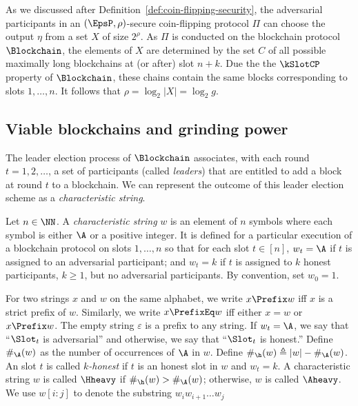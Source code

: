 As we discussed after Definition~\ref{def:coin-flipping-security}, 
the adversarial participants in an $(\EpsP, \rho)$-secure 
coin-flipping protocol $\Pi$ can choose the output $\eta$ 
from a set $X$ of size $2^\rho$. 
As $\Pi$ is conducted on the blockchain protocol $\Blockchain$, 
the elements of $X$ are determined by 
the set $C$ of all possible maximally long blockchains 
at (or after) slot $n + k$. 
Due the the $\kSlotCP$ property of $\Blockchain$, 
these chains contain the same blocks corresponding to slots $1, \ldots, n$. 
It follows that $\rho = \log_2 |X| = \log_2 g$.

\subsection{Viable blockchains and grinding power}

The leader election process of $\Blockchain$ associates, 
with each round $t = 1, 2, \ldots$, 
a set of participants (called \emph{leaders}) 
that are entitled to add a block at round $t$ to a blockchain. 
We can represent the outcome of this leader election scheme 
as a \emph{characteristic string}.


\begin{definition}\label{def:bivalent-char-string}
  Let $n \in \NN$.
  A \emph{characteristic string} $w$ 
  is an element of $n$ symbols where 
  each symbol is either $\A$ or a positive integer. 
  It is defined for a particular execution of a blockchain protocol 
  on slots $1, \ldots, n$ so that 
  for each slot $t \in [n]$, 
  $w_t = \A$ if $t$ is assigned to an adversarial participant; and 
  $w_t = k$ if $t$ is assigned to $k$ honest participants, $k \geq 1$, 
  but no adversarial participants.
  By convention, set $w_0 = 1$.
\end{definition}

For two strings $x$ and $w$ on the same alphabet, 
we write $x \Prefix w$ iff $x$ is a strict prefix of $w$. 
Similarly, 
we write $x \PrefixEq w$ iff either $x = w$ or $x \Prefix w$. 
The empty string $\varepsilon$ is a prefix to any string. 
If $w_t = \A$, we say that ``$\Slot_t$ is adversarial'' and 
otherwise, we say that ``$\Slot_t$ is honest.'' 
Define $\#_\A(w)$ as the number of occurrences of $\A$ in $w$. 
Define $\#_\h(w) \triangleq |w| - \#_\A(w)$.
An slot $t$ is called \emph{$k$-honest} if 
$t$ is an honest slot in $w$ and $w_t = k$.
A characteristic string $w$ is called $\Hheavy$ if 
$\#_\h(w) > \#_\A(w)$; 
otherwise, $w$ is called $\Aheavy$. 
We use $w[i : j]$ to denote the substring $w_i w_{i+1}\ldots w_j$ 


